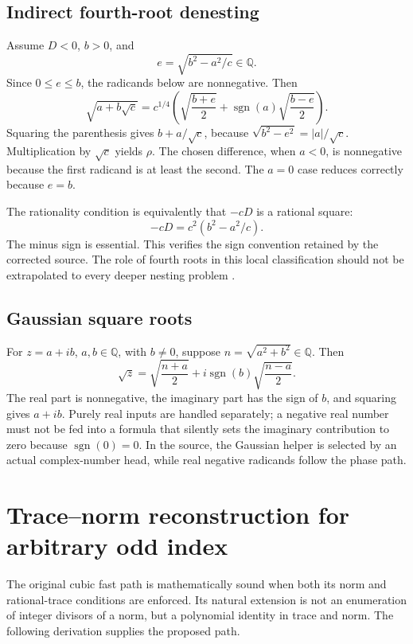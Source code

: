 \documentclass[11pt,letterpaper]{article}
\numberwithin{equation}{section}
\theoremstyle{definition}\newtheorem{definition}[theorem]{Definition}
\theoremstyle{remark}\newtheorem{remark}[theorem]{Remark}
\newcommand{\Q}{\mathbb Q}\newcommand{\C}{\mathbb C}\newcommand{\R}{\mathbb R}\newcommand{\Z}{\mathbb Z}
\newcommand{\sgn}{\operatorname{sgn}}
\newcommand{\code}[1]{\texttt{\detokenize{#1}}}
\begin{document}
\subsection{Indirect fourth-root denesting}
Assume $D<0$, $b>0$, and
\begin{equation}
e=\sqrt{b^2-a^2/c}\in\Q.
\end{equation}
Since $0\le e\le b$, the radicands below are nonnegative. Then
\begin{equation}
\sqrt{a+b\sqrt c}
=c^{1/4}\left(
 \sqrt{\frac{b+e}{2}}+\sgn(a)\sqrt{\frac{b-e}{2}}
\right).
\label{eq:indirect}
\end{equation}
Squaring the parenthesis gives $b+a/\sqrt c$, because
$\sqrt{b^2-e^2}=|a|/\sqrt c$. Multiplication by $\sqrt c$ yields $\rho$. The chosen difference, when $a<0$, is nonnegative because the first radicand is at least the second. The $a=0$ case reduces correctly because $e=b$.

The rationality condition is equivalently that $-cD$ is a rational square:
\begin{equation}
-cD=c^2\left(b^2-a^2/c\right).
\end{equation}
The minus sign is essential. This verifies the sign convention retained by the corrected source. The role of fourth roots in this local classification should not be extrapolated to every deeper nesting problem \cite{bfht,gkioulekas}.

\subsection{Gaussian square roots}
For $z=a+ib$, $a,b\in\Q$, with $b\ne0$, suppose $n=\sqrt{a^2+b^2}\in\Q$. Then
\begin{equation}
\sqrt z=\sqrt{\frac{n+a}{2}}+i\sgn(b)\sqrt{\frac{n-a}{2}}.
\end{equation}
The real part is nonnegative, the imaginary part has the sign of $b$, and squaring gives $a+ib$. Purely real inputs are handled separately; a negative real number must not be fed into a formula that silently sets the imaginary contribution to zero because $\sgn(0)=0$. In the source, the Gaussian helper is selected by an actual complex-number head, while real negative radicands follow the phase path.

\section{Trace--norm reconstruction for arbitrary odd index}
\label{sec:odd}
The original cubic fast path is mathematically sound when both its norm and rational-trace conditions are enforced. Its natural extension is not an enumeration of integer divisors of a norm, but a polynomial identity in trace and norm. The following derivation supplies the proposed \code{"HigherOddQuadratic"} path.
\end{document}
